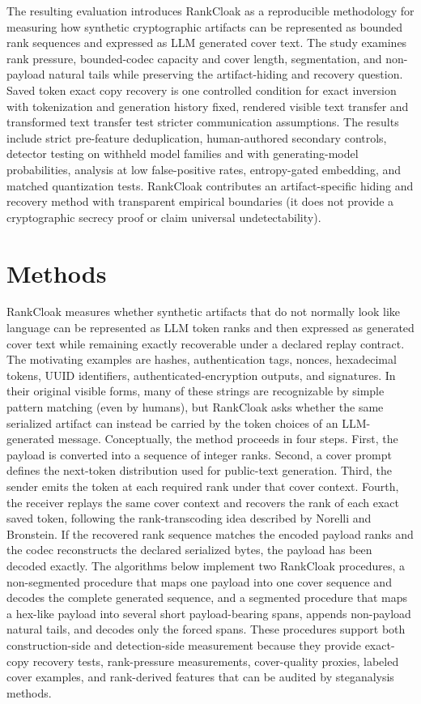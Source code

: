 \documentclass[fleqn,10pt]{wlscirep}
\begin{document}
The resulting evaluation introduces RankCloak as a reproducible methodology for measuring how synthetic cryptographic artifacts can be represented as bounded rank sequences and expressed as LLM generated cover text. The study examines rank pressure, bounded-codec capacity and cover length, segmentation, and non-payload natural tails while preserving the artifact-hiding and recovery question. Saved token exact copy recovery is one controlled condition for exact inversion with tokenization and generation history fixed, rendered visible text transfer and transformed text transfer test stricter communication assumptions. The results include strict pre-feature deduplication, human-authored secondary controls, detector testing on withheld model families and with generating-model probabilities, analysis at low false-positive rates, entropy-gated embedding, and matched quantization tests. RankCloak contributes an artifact-specific hiding and recovery method with transparent empirical boundaries (it does not provide a cryptographic secrecy proof or claim universal undetectability).




\section*{Methods}\label{sec:methods}

RankCloak measures whether synthetic artifacts that do not normally look like language can be represented as LLM token ranks and then expressed as generated cover text while remaining exactly recoverable under a declared replay contract. The motivating examples are hashes, authentication tags, nonces, hexadecimal tokens, UUID identifiers, authenticated-encryption outputs, and signatures. In their original visible forms, many of these strings are recognizable by simple pattern matching (even by humans), but RankCloak asks whether the same serialized artifact can instead be carried by the token choices of an LLM-generated message. Conceptually, the method proceeds in four steps. First, the payload is converted into a sequence of integer ranks. Second, a cover prompt defines the next-token distribution used for public-text generation. Third, the sender emits the token at each required rank under that cover context. Fourth, the receiver replays the same cover context and recovers the rank of each exact saved token, following the rank-transcoding idea described by Norelli and Bronstein\cite{NorelliBronstein2026Calgacus}. If the recovered rank sequence matches the encoded payload ranks and the codec reconstructs the declared serialized bytes, the payload has been decoded exactly. The algorithms below implement two RankCloak procedures, a non-segmented procedure that maps one payload into one cover sequence and decodes the complete generated sequence, and a segmented procedure that maps a hex-like payload into several short payload-bearing spans, appends non-payload natural tails, and decodes only the forced spans. These procedures support both construction-side and detection-side measurement because they provide exact-copy recovery tests, rank-pressure measurements, cover-quality proxies, labeled cover examples, and rank-derived features that can be audited by steganalysis methods.
\end{document}
